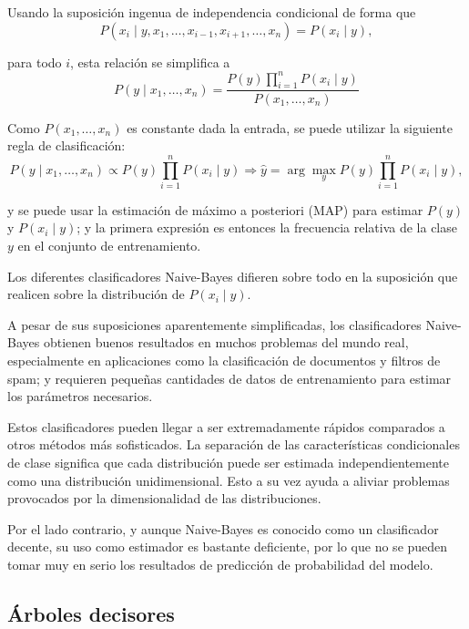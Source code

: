 Usando la suposición ingenua de independencia condicional de forma que
\begin{equation*}
    P(x_{i} \mid y,x_{1},\dots,x_{i-1},x_{i+1},\dots,x_{n})=P(x_{i}\mid y),
\end{equation*}

para todo $i$, esta relación se simplifica a 
\begin{equation*}
    P(y\mid x_{1},\dots,x_{n})=\dfrac{P(y) \prod^{n}_{i=1} P(x_{i}\mid y)}{P(x_{1},\dots,x_{n})}
\end{equation*}

Como $P(x_{1},\dots,x_{n})$ es constante dada la entrada, se puede utilizar la siguiente regla de clasificación:
\begin{equation*}
    P(y\mid x_{1},\dots,x_{n}) \propto P(y) \prod^{n}_{i=1}P(x_{i}\mid y) \Rightarrow 
    \hat{y} = \arg \max_{y} P(y) \prod^{n}_{i=1}P(x_{i}\mid y),
\end{equation*}

y se puede usar la estimación de máximo a posteriori (MAP) para estimar $P(y)$ y $P(x_{i}\mid y)$; y la primera expresión es entonces la frecuencia relativa de la clase $y$ en el conjunto de entrenamiento.

Los diferentes clasificadores Naive-Bayes difieren sobre todo en la suposición que realicen sobre la distribución de $P(x_{i} \mid y)$.

A pesar de sus suposiciones aparentemente simplificadas, 
los clasificadores Naive-Bayes obtienen buenos resultados en muchos problemas del mundo real, 
especialmente en aplicaciones como la clasificación de documentos y filtros de spam;
y requieren pequeñas cantidades de datos de entrenamiento para estimar los parámetros necesarios.

Estos clasificadores pueden llegar a ser extremadamente rápidos comparados a otros métodos más sofisticados. La separación de las características condicionales de clase significa que cada distribución puede ser estimada independientemente como una distribución unidimensional.
Esto a su vez ayuda a aliviar problemas provocados por la dimensionalidad de las distribuciones.

Por el lado contrario, y aunque Naive-Bayes es conocido como un clasificador decente, su uso como estimador es bastante deficiente, por lo que no se pueden tomar muy en serio los resultados de predicción de probabilidad del modelo.

\subsection{Árboles decisores}

